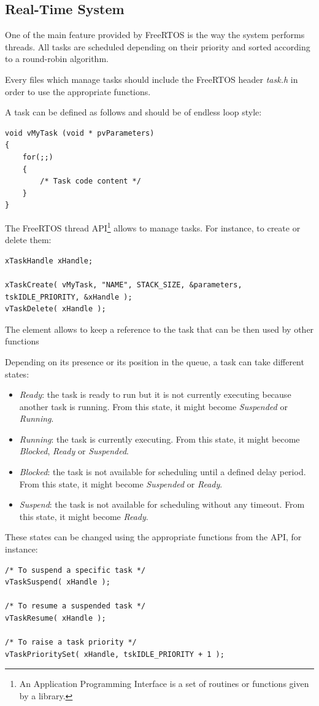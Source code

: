 \subsection{Real-Time System}

\hspace{15mm}One of the main feature provided by FreeRTOS is the way the system performs threads. All tasks are scheduled depending on their priority and sorted according to a round-robin algorithm.

Every files which manage tasks should include the FreeRTOS header \textit{task.h} in order to use the appropriate functions.

A task can be defined as follows and should be of endless loop style:\clearpage
\begin{lstlisting}
void vMyTask (void * pvParameters)
{
	for(;;)
	{
		/* Task code content */
	}
}
\end{lstlisting}

The FreeRTOS thread API\footnote{An Application Programming Interface is a set of routines or functions given by a library.} allows to manage tasks. For instance, to create or delete them:
\begin{lstlisting}
xTaskHandle xHandle;

xTaskCreate( vMyTask, "NAME", STACK_SIZE, &parameters, tskIDLE_PRIORITY, &xHandle );
vTaskDelete( xHandle );
\end{lstlisting}
The  element allows to keep a reference to the task that can be then used by other functions

Depending on its presence or its position in the queue, a task can take different states:
\begin{itemize}
\item \textit{Ready}: the task is ready to run but it is not currently executing because another task is running. From this state, it might become \textit{Suspended} or \textit{Running}.
\item \textit{Running}: the task is currently executing. From this state, it might become \textit{Blocked}, \textit{Ready} or \textit{Suspended}.
\item \textit{Blocked}: the task is not available for scheduling until a defined delay period. From this state, it might become \textit{Suspended} or \textit{Ready}.
\item \textit{Suspend}: the task is not available for scheduling without any timeout. From this state, it might become \textit{Ready}.
\end{itemize}
These states can be changed using the appropriate functions from the API, for instance:
\begin{lstlisting}
/* To suspend a specific task */
vTaskSuspend( xHandle );

/* To resume a suspended task */
vTaskResume( xHandle );

/* To raise a task priority */
vTaskPrioritySet( xHandle, tskIDLE_PRIORITY + 1 );
\end{lstlisting}


